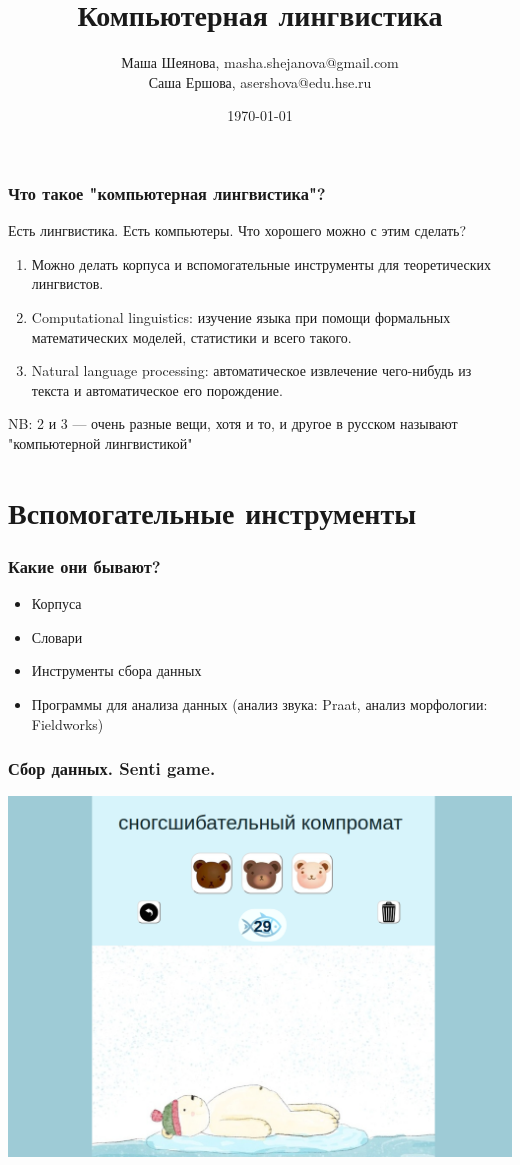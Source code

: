 \documentclass[10pt, compress]{beamer}
\title{Компьютерная лингвистика}
\subtitle{}
\date{\today}
\author{Маша Шеянова, masha.shejanova@gmail.com\\
        Саша Ершова, asershova@edu.hse.ru}
\institute{НИУ ВШЭ}
\begin{document}
\maketitle

\begin{frame}[fragile]
  \frametitle{Что такое "компьютерная лингвистика"?}
  Есть лингвистика. Есть компьютеры. Что хорошего можно с этим сделать?
  
  \begin{enumerate}
  \item Можно делать корпуса и вспомогательные инструменты для теоретических лингвистов.
  \item Computational linguistics: изучение языка при помощи формальных математических моделей, статистики и всего такого.
  \item Natural language processing: автоматическое извлечение чего-нибудь из текста и автоматическое его порождение.
  \end{enumerate}
  
  \alert{NB:} 2 и 3 --- очень разные вещи, хотя и то, и другое в русском называют "компьютерной лингвистикой"
\end{frame}
\section{Вспомогательные инструменты}

\begin{frame}[fragile]
  \frametitle{Какие они бывают?}
  \begin{itemize}
  \item Корпуса
  \item Словари
  \item Инструменты сбора данных
  \item Программы для анализа данных (анализ звука: Praat, анализ морфологии: Fieldworks) 
  \end{itemize}
\end{frame}

\begin{frame}
  \frametitle{Сбор данных. Senti game.}
  \includegraphics[width=\textwidth]{images/sentinet.png}
\end{frame}
\end{document}
